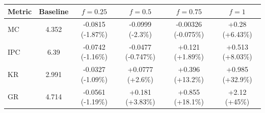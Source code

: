 \begin{tabular}{lccccc}
\toprule
Metric & Baseline & $f=0.25$ & $f=0.5$ & $f=0.75$ & $f=1$ \\
\midrule
MC & 4.352 & -0.0815 (-1.87\%) & -0.0999 (-2.3\%) & -0.00326 (-0.075\%) & +0.28 (+6.43\%) \\
IPC & 6.39 & -0.0742 (-1.16\%) & -0.0477 (-0.747\%) & +0.121 (+1.89\%) & +0.513 (+8.03\%) \\
KR & 2.991 & -0.0327 (-1.09\%) & +0.0777 (+2.6\%) & +0.396 (+13.2\%) & +0.985 (+32.9\%) \\
GR & 4.714 & -0.0561 (-1.19\%) & +0.181 (+3.83\%) & +0.855 (+18.1\%) & +2.12 (+45\%) \\
\bottomrule
\end{tabular}
